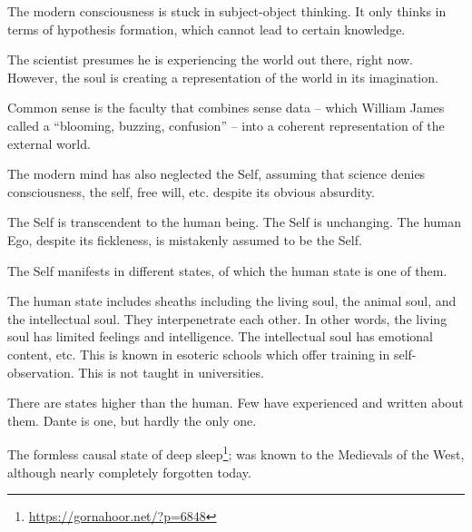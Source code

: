 The modern consciousness is stuck in subject-object thinking. It only thinks in terms of hypothesis formation, which cannot lead to certain knowledge.

The scientist presumes he is experiencing the world out there, right now. However, the soul is creating a representation of the world in its imagination.

Common sense is the faculty that combines sense data -- which William James called a ``blooming, buzzing, confusion'' -- into a coherent representation of the external world.

The modern mind has also neglected the Self, assuming that science denies consciousness, the self, free will, etc. despite its obvious absurdity.

The Self is transcendent to the human being. The Self is unchanging. The human Ego, despite its fickleness, is mistakenly assumed to be the Self.

The Self manifests in different states, of which the human state is one of them.

The human state includes sheaths including the living soul, the animal soul, and the intellectual soul. They interpenetrate each other. In other words, the living soul has limited feelings and intelligence. The intellectual soul has emotional content, etc. This is known in esoteric schools which offer training in self-observation. This is not taught in universities.

There are states higher than the human. Few have experienced and written about them. Dante is one, but hardly the only one.

The formless causal state of deep sleep\footnote{\url{https://gornahoor.net/?p=6848}}; was known to the Medievals of the West, although nearly completely forgotten today.




